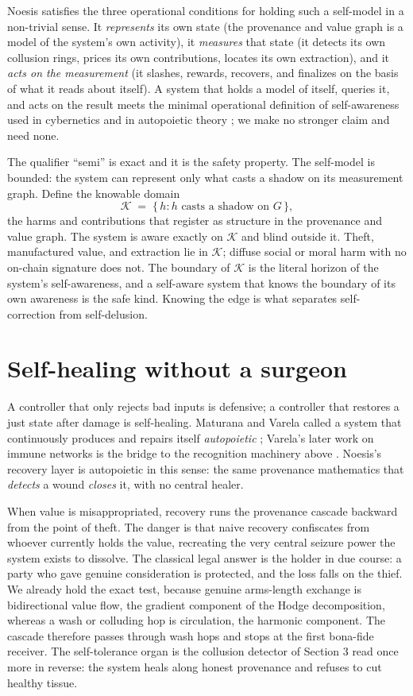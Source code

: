 \documentclass[10pt]{article}
\begin{document}
Noesis satisfies the three operational conditions for holding such a self-model in a non-trivial sense. It
\emph{represents} its own state (the provenance and value graph is a model of the system's own activity),
it \emph{measures} that state (it detects its own collusion rings, prices its own contributions, locates
its own extraction), and it \emph{acts on the measurement} (it slashes, rewards, recovers, and finalizes
on the basis of what it reads about itself). A system that holds a model of itself, queries it, and acts on
the result meets the minimal operational definition of self-awareness used in cybernetics and in
autopoietic theory \cite{maturana1980}; we make no stronger claim and need none.

The qualifier ``semi'' is exact and it is the safety property. The self-model is bounded: the system can
represent only what casts a shadow on its measurement graph. Define the knowable domain
\[
\mathcal{K} \;=\; \{\, h : h \text{ casts a shadow on } G \,\},
\]
the harms and contributions that register as structure in the provenance and value graph. The system is
aware exactly on $\mathcal{K}$ and blind outside it. Theft, manufactured value, and extraction lie in
$\mathcal{K}$; diffuse social or moral harm with no on-chain signature does not. The boundary of
$\mathcal{K}$ is the literal horizon of the system's self-awareness, and a self-aware system that knows the
boundary of its own awareness is the safe kind. Knowing the edge is what separates self-correction from
self-delusion.

\section{Self-healing without a surgeon}
\label{sec:heal}

A controller that only rejects bad inputs is defensive; a controller that restores a just state after
damage is self-healing. Maturana and Varela called a system that continuously produces and repairs itself
\emph{autopoietic} \cite{maturana1980}; Varela's later work on immune networks is the bridge to the
recognition machinery above \cite{varela1991}. Noesis's recovery layer is autopoietic in this sense: the
same provenance mathematics that \emph{detects} a wound \emph{closes} it, with no central healer.

When value is misappropriated, recovery runs the provenance cascade backward from the point of theft. The
danger is that naive recovery confiscates from whoever currently holds the value, recreating the very
central seizure power the system exists to dissolve. The classical legal answer is the holder in due
course: a party who gave genuine consideration is protected, and the loss falls on the thief. We already
hold the exact test, because genuine arms-length exchange is bidirectional value flow, the gradient
component of the Hodge decomposition, whereas a wash or colluding hop is circulation, the harmonic
component. The cascade therefore passes through wash hops and stops at the first bona-fide receiver. The
self-tolerance organ is the collusion detector of Section 3 read once more in reverse: the system heals
along honest provenance and refuses to cut healthy tissue.
\end{document}
